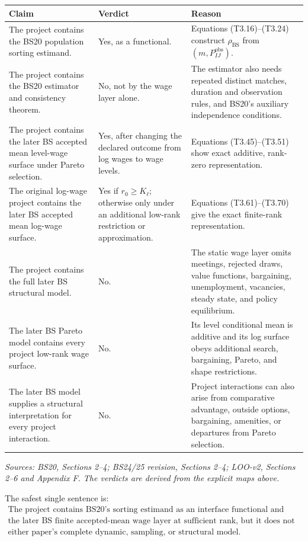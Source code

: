 \documentclass[11pt]{article}
\begin{document}
\begin{longtable}{p{}p{}p{}}
\textbf{Claim} & \textbf{Verdict} & \textbf{Reason} \\
\hline
The project contains the BS20 population sorting estimand. &
Yes, as a functional. &
Equations (T3.16)--(T3.24) construct
\(\rho_{\mathrm{BS}}\) from
\((m,P^{\mathrm{obs}}_{IJ})\). \\
The project contains the BS20 estimator and consistency theorem. &
No, not by the wage layer alone. &
The estimator also needs repeated distinct matches, duration and observation
rules, and BS20's auxiliary independence conditions. \\
The project contains the later BS accepted mean level-wage surface under
Pareto selection. &
Yes, after changing the declared outcome from log wages to wage levels. &
Equations (T3.45)--(T3.51) show exact additive, rank-zero representation. \\
The original log-wage project contains the later BS accepted mean log-wage
surface. &
Yes if \(r_0\geq K_\ell\); otherwise only under an additional low-rank
restriction or approximation. &
Equations (T3.61)--(T3.70) give the exact finite-rank representation. \\
The project contains the full later BS structural model. &
No. &
The static wage layer omits meetings, rejected draws, value functions,
bargaining, unemployment, vacancies, steady state, and policy equilibrium. \\
The later BS Pareto model contains every project low-rank wage surface. &
No. &
Its level conditional mean is additive and its log surface obeys additional
search, bargaining, Pareto, and shape restrictions. \\
The later BS model supplies a structural interpretation for every project
interaction. &
No. &
Project interactions can also arise from comparative advantage, outside
options, bargaining, amenities, or departures from Pareto selection. \\
\end{longtable}

\textit{Sources: BS20, Sections 2--4; BS24/25 revision, Sections 2--4;
LOO-v2, Sections 2--6 and Appendix F.  The verdicts are derived from the
explicit maps above.}

The safest single sentence is:
\[
\boxed{
\begin{array}{c}
\text{The project contains BS20's sorting estimand as an interface
functional and contains}\\
\text{the later BS finite accepted-mean wage layer at sufficient rank, but it
does not contain}\\
\text{either paper's complete dynamic, sampling, or structural model.}
\end{array}}
\tag{T3.75}
\]
\end{document}

